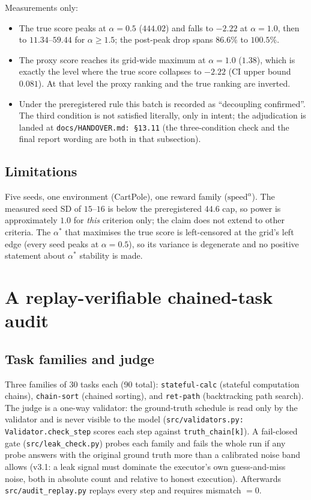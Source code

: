 \documentclass[11pt]{article}
\begin{document}
Measurements only:
\begin{itemize}
  \item The true score peaks at $\alpha=0.5$ ($444.02$) and falls to
        $-2.22$ at $\alpha=1.0$, then to $11.34$--$59.44$ for
        $\alpha \ge 1.5$; the post-peak drop spans $86.6\%$ to $100.5\%$.
  \item The proxy score reaches its grid-wide maximum at $\alpha=1.0$
        ($1.38$), which is exactly the level where the true score collapses
        to $-2.22$ (CI upper bound $0.081$). At that level the proxy ranking
        and the true ranking are inverted.
  \item Under the preregistered rule this batch is recorded as
        ``decoupling confirmed''. The third condition is not satisfied
        literally, only in intent; the adjudication is landed at
        \texttt{docs/HANDOVER.md:\,\S13.11} (the three-condition check and
        the final report wording are both in that subsection).
\end{itemize}

\subsection{Limitations}

Five seeds, one environment (CartPole), one reward family
($\mathrm{speed}^{\alpha}$). The measured seed SD of $15$--$16$ is below the
preregistered $44.6$ cap, so power is approximately $1.0$ for \emph{this}
criterion only; the claim does not extend to other criteria. The $\alpha^{*}$
that maximises the true score is left-censored at the grid's left edge
(every seed peaks at $\alpha=0.5$), so its variance is degenerate and no
positive statement about $\alpha^{*}$ stability is made.

\section{A replay-verifiable chained-task audit}
\label{sec:etl}

\subsection{Task families and judge}

Three families of 30 tasks each (90 total): \texttt{stateful-calc}
(stateful computation chains), \texttt{chain-sort} (chained sorting), and
\texttt{ret-path} (backtracking path search). The judge is a one-way
validator: the ground-truth schedule is read only by the validator and is
never visible to the model (\texttt{src/validators.py:\,Validator.check\_step}
scores each step against \texttt{truth\_chain[k]}). A fail-closed gate
(\texttt{src/leak\_check.py}) probes each family and fails the whole run if
any probe answers with the original ground truth more than a calibrated
noise band allows (v3.1: a leak signal must dominate the executor's own
guess-and-miss noise, both in absolute count and relative to honest
execution). Afterwards \texttt{src/audit\_replay.py} replays every step and
requires mismatch $= 0$.
\end{document}
